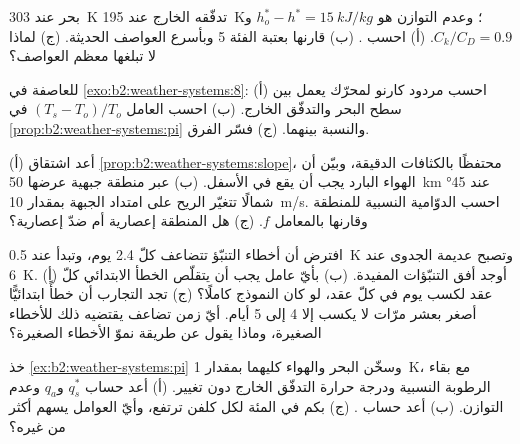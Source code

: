 \begin{exercise}[$\star\star$]\label{exo:b2:weather-systems:8}
بحر عند \qty{303}{K} تدفّقه الخارج عند \qty{195}{K}؛ وعدم التوازن هو $h_o^* - h^* =
\qty{15}{kJ/kg}$ و$C_k/C_D = 0.9$. (أ) احسب . (ب) قارنها
بعتبة الفئة 5 وبأسرع العواصف الحديثة. (ج) لماذا لا تبلغها معظم
العواصف؟
\end{exercise}

\begin{exercise}[$\star\star$]\label{exo:b2:weather-systems:9}
للعاصفة في \cref{exo:b2:weather-systems:8}: (أ) احسب مردود كارنو لمحرّك
يعمل بين سطح البحر والتدفّق الخارج. (ب) احسب العامل $(T_s - T_o)/T_o$ في
\cref{prop:b2:weather-systems:pi} والنسبة بينهما. (ج) فسّر الفرق.
\end{exercise}

\begin{exercise}[$\star\star\star$]\label{exo:b2:weather-systems:10}
(أ) أعد اشتقاق \cref{prop:b2:weather-systems:slope}، محتفظًا بالكثافات الدقيقة، وبيّن أن
الهواء البارد يجب أن يقع في الأسفل. (ب) عبر منطقة جبهية عرضها \qty{50}{km} عند \ang{45} شمالًا تتغيّر الريح
على امتداد الجبهة بمقدار \qty{10}{m/s}. احسب الدوّامية النسبية للمنطقة وقارنها
بالمعامل $f$. (ج) هل المنطقة إعصارية أم ضدّ إعصارية؟
\end{exercise}

\begin{exercise}[$\star\star\star$]\label{exo:b2:weather-systems:11}
افترض أن أخطاء التنبّؤ تتضاعف كلّ 2.4 يوم، وتبدأ عند \qty{0.5}{K} وتصبح عديمة الجدوى عند
\qty{6}{K}. (أ) أوجد أفق التنبّؤات المفيدة. (ب) بأيّ عامل يجب أن يتقلّص الخطأ الابتدائي
كلّ عقد لكسب يوم في كلّ عقد، لو كان النموذج كاملًا؟ (ج) تجد التجارب أن
خطأً ابتدائيًّا أصغر بعشر مرّات لا يكسب إلا 4 إلى 5 أيام. أيّ زمن تضاعف يقتضيه ذلك
للأخطاء الصغيرة، وماذا يقول عن طريقة نموّ الأخطاء الصغيرة؟
\end{exercise}

\begin{exercise}[$\star\star\star$]\label{exo:b2:weather-systems:12}
خذ \cref{ex:b2:weather-systems:pi} وسخّن البحر والهواء كليهما بمقدار \qty{1}{K}، مع بقاء
الرطوبة النسبية ودرجة حرارة التدفّق الخارج دون تغيير. (أ) أعد حساب $q_s^*$ و$q_a$
وعدم التوازن. (ب) أعد حساب . (ج) بكم في المئة لكل كلفن
ترتفع، وأيّ العوامل يسهم أكثر من غيره؟
\end{exercise}

